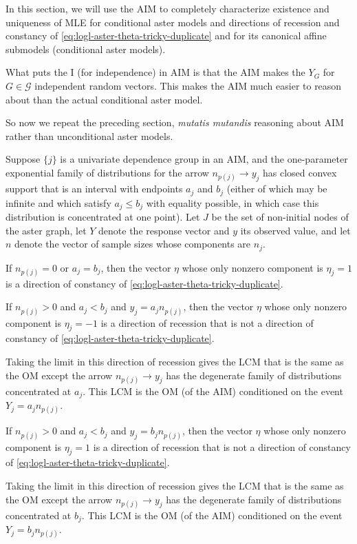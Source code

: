 In this section,
we will use the AIM to completely characterize existence and uniqueness
of MLE for conditional aster models and directions of recession and constancy
of \eqref{eq:logl-aster-theta-tricky-duplicate} and for its canonical
affine submodels (conditional aster models).

What puts the I (for independence) in AIM is that the AIM makes
the $Y_G$ for $G \in \mathcal{G}$ independent random vectors.
This makes the AIM much easier to reason about than the actual conditional
aster model.

So now we repeat the preceding section, \emph{mutatis mutandis} reasoning
about AIM rather than unconditional aster models.

\begin{theorem} \label{th:dor-aim-arrow}
Suppose $\{j\}$ is a univariate dependence group in an AIM, and
the one-parameter exponential family of distributions for the arrow
$n_{p(j)} \longrightarrow y_j$ has closed convex support that is an
interval with endpoints $a_j$ and $b_j$ (either of which may be infinite and
which satisfy $a_j \le b_j$ with equality possible, in which case this
distribution is concentrated at one point).  Let $J$
be the set of non-initial nodes of the aster graph,
let $Y$ denote the response vector and $y$ its observed value,
and let $n$ denote the vector of sample sizes whose components are $n_j$.

If $n_{p(j)} = 0$ or $a_j = b_j$,
then the vector $\eta$ whose only nonzero component
is $\eta_j = 1$ is a direction of constancy
of \eqref{eq:logl-aster-theta-tricky-duplicate}.

If $n_{p(j)} > 0$ and $a_j < b_j$ and $y_j = a_j n_{p(j)}$,
then the vector $\eta$ whose only nonzero component
is $\eta_j = -1$ is a direction of recession
that is not a direction of constancy
of \eqref{eq:logl-aster-theta-tricky-duplicate}.

Taking the limit in this direction of recession
gives the LCM that is the same as the OM except the arrow
$n_{p(j)} \longrightarrow y_j$ has the degenerate family of distributions
concentrated at $a_j$.
This LCM is the OM (of the AIM) conditioned on the event $Y_j = a_j n_{p(j)}$.

If $n_{p(j)} > 0$ and $a_j < b_j$ and $y_j = b_j n_{p(j)}$,
then the vector $\eta$ whose only nonzero component
is $\eta_j = 1$ is a direction of recession
that is not a direction of constancy
of \eqref{eq:logl-aster-theta-tricky-duplicate}.

Taking the limit in this direction of recession
gives the LCM that is the same as the OM except the arrow
$n_{p(j)} \longrightarrow y_j$ has the degenerate family of distributions
concentrated at $b_j$.
This LCM is the OM (of the AIM) conditioned on the event $Y_j = b_j n_{p(j)}$.
\end{theorem}

